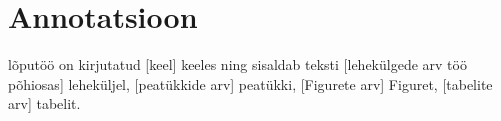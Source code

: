 \section*{\centering Annotatsioon}

lõputöö on kirjutatud [keel] keeles ning sisaldab teksti [lehekülgede arv töö põhiosas] leheküljel, 
[peatükkide arv] peatükki,  [Figurete arv] Figuret,  [tabelite arv] tabelit.



\pagebreak